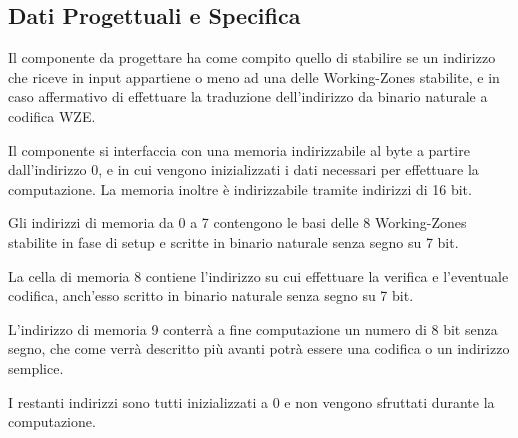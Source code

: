 \documentclass{article}
\begin{document}
\subsection{Dati Progettuali e Specifica}
\begin{flushleft}

Il componente da progettare ha come compito quello di stabilire se un indirizzo che riceve in input appartiene o meno ad una delle Working-Zones stabilite, e in caso affermativo di effettuare la traduzione dell'indirizzo da binario naturale a codifica WZE.

\medskip

Il componente si interfaccia con una memoria indirizzabile al byte a partire dall'indirizzo 0, e in cui vengono inizializzati i dati necessari per effettuare la computazione. La memoria inoltre è indirizzabile tramite indirizzi di 16 bit.

\medskip

Gli indirizzi di memoria da 0 a 7 contengono le basi delle 8 Working-Zones stabilite in fase di setup e scritte in binario naturale senza segno su 7 bit.
\smallskip

La cella di memoria 8 contiene l'indirizzo su cui effettuare la verifica e l'eventuale codifica, anch'esso scritto in binario naturale senza segno su 7 bit.
\smallskip

L'indirizzo di memoria 9 conterrà a fine computazione un numero di 8 bit senza segno, che come verrà descritto più avanti potrà essere una codifica o un indirizzo semplice.

\medskip

I restanti indirizzi sono tutti inizializzati a 0 e non vengono sfruttati durante la computazione.

\end{flushleft}
\end{document}
